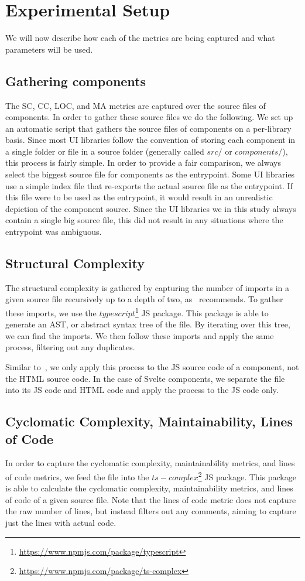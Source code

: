 \section{Experimental Setup}
We will now describe how each of the metrics are being captured and what parameters will be used.

\subsection{Gathering components}\label{sec:experimental-setup:gathering-components}
The SC, CC, LOC, and MA metrics are captured over the source files of components. In order to gather these source files we do the following. We set up an automatic script that gathers the source files of components on a per-library basis. Since most UI libraries follow the convention of storing each component in a single folder or file in a source folder (generally called \(src/\) or \(components/\)), this process is fairly simple. In order to provide a fair comparison, we always select the biggest source file for components as the entrypoint. Some UI libraries use a simple index file that re-exports the actual source file as the entrypoint. If this file were to be used as the entrypoint, it would result in an unrealistic depiction of the component source. Since the UI libraries we in this study always contain a single big source file, this did not result in any situations where the entrypoint was ambiguous.

\subsection{Structural Complexity}
The structural complexity is gathered by capturing the number of imports in a given source file recursively up to a depth of two, as~\cite{martinez-ortiz2016quality} recommends. To gather these imports, we use the \(typescript\)\footnote{\url{https://www.npmjs.com/package/typescript}} JS package. This package is able to generate an AST, or abstract syntax tree of the file. By iterating over this tree, we can find the imports. We then follow these imports and apply the same process, filtering out any duplicates.

Similar to~\cite{martinez-ortiz2016quality}, we only apply this process to the JS source code of a component, not the HTML source code. In the case of Svelte components, we separate the file into its JS code and HTML code and apply the process to the JS code only.

\subsection{Cyclomatic Complexity, Maintainability, Lines of Code}
In order to capture the cyclomatic complexity, maintainability metrics, and lines of code metrics, we feed the file into the \(ts-complex\)\footnote{\url{https://www.npmjs.com/package/ts-complex}} JS package. This package is able to calculate the cyclomatic complexity, maintainability metrics, and lines of code of a given source file. Note that the lines of code metric does not capture the raw number of lines, but instead filters out any comments, aiming to capture just the lines with actual code.

